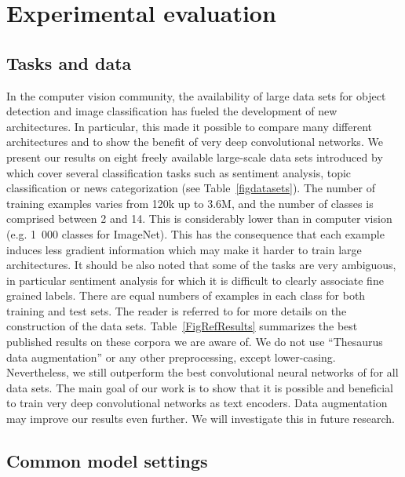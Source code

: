 \documentclass[a4paper,11pt]{article}
\newcommand{\eg}{e.g. }
\begin{document}
\section{Experimental evaluation}
\label{SectExp}

\subsection{Tasks and data}
\label{SectData}



In the computer vision community, the availability of large data sets for
object detection and image classification has fueled the development of new
architectures. In particular, this made it possible to compare many different
architectures and to show the benefit of very deep convolutional networks.
We present our results on eight freely available large-scale data sets
introduced by \cite{Zhang:2015_nips:text_convnet} which cover several
classification tasks such as sentiment analysis, topic classification or news
categorization (see Table~\ref{figdatasets}). The number of training examples
varies from 120k up to 3.6M, and the number of classes is comprised between 2
and 14.  This is considerably lower than in computer vision (\eg 1~000 classes
for ImageNet). This has the consequence that each example induces less
gradient information which may make it harder to train large architectures.  It should be
also noted that some of the tasks are very ambiguous, in particular sentiment
analysis for which it is difficult to clearly associate fine grained labels.
There are equal numbers of examples in each class for both training and test
sets.  The reader is referred to \cite{Zhang:2015_nips:text_convnet} for more
details on the construction of the data sets.
Table~\ref{FigRefResults} summarizes the best published results on these corpora
we are aware of.
We do not use ``Thesaurus data augmentation'' or
any other preprocessing, except lower-casing. Nevertheless, we still
outperform the best convolutional neural networks of
\cite{Zhang:2015_nips:text_convnet} for all data sets.  The main goal of our
work is to show that it is possible and beneficial to train very deep
convolutional networks as text encoders. Data augmentation may improve our
results even further.  We will investigate this in future research.

\subsection{Common model settings}
\end{document}
